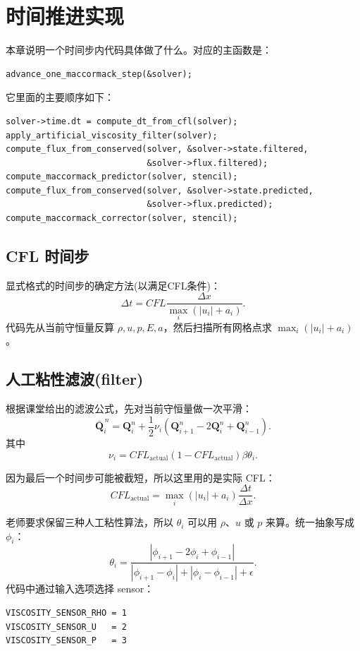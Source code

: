 \section{时间推进实现}

本章说明一个时间步内代码具体做了什么。对应的主函数是：
\begin{lstlisting}
advance_one_maccormack_step(&solver);
\end{lstlisting}
它里面的主要顺序如下：
\begin{lstlisting}
solver->time.dt = compute_dt_from_cfl(solver);
apply_artificial_viscosity_filter(solver);
compute_flux_from_conserved(solver, &solver->state.filtered,
                            &solver->flux.filtered);
compute_maccormack_predictor(solver, stencil);
compute_flux_from_conserved(solver, &solver->state.predicted,
                            &solver->flux.predicted);
compute_maccormack_corrector(solver, stencil);
\end{lstlisting}

\subsection{CFL 时间步}

显式格式的时间步的确定方法(以满足CFL条件)：
\[
\Delta t = CFL\frac{\Delta x}{\max_i(|u_i|+a_i)}.
\]
代码先从当前守恒量反算 \(\rho,u,p,E,a\)，然后扫描所有网格点求
\(\max_i(|u_i|+a_i)\)。

\subsection{人工粘性滤波(filter)}

根据课堂给出的滤波公式，先对当前守恒量做一次平滑：
\[
\bar{\bm Q}^{\,n}_i
=\bm Q_i^n
+\frac12\nu_i
\left(\bm Q_{i+1}^n-2\bm Q_i^n+\bm Q_{i-1}^n\right).
\]
其中
\[
\nu_i=CFL_{\mathrm{actual}}(1-CFL_{\mathrm{actual}})\beta\theta_i.
\]

因为最后一个时间步可能被截短，所以这里用的是实际 CFL：
\[
CFL_{\mathrm{actual}}
=\max_i(|u_i|+a_i)\frac{\Delta t}{\Delta x}.
\]

老师要求保留三种人工粘性算法，所以 \(\theta_i\) 可以用
\(\rho\)、\(u\) 或 \(p\) 来算。统一抽象写成 \(\phi_i\)：
\[
\theta_i=
\frac{|\phi_{i+1}-2\phi_i+\phi_{i-1}|}
{|\phi_{i+1}-\phi_i|+|\phi_i-\phi_{i-1}|+\epsilon}.
\]
代码中通过输入选项选择 sensor：
\begin{lstlisting}
VISCOSITY_SENSOR_RHO = 1
VISCOSITY_SENSOR_U   = 2
VISCOSITY_SENSOR_P   = 3
\end{lstlisting}

